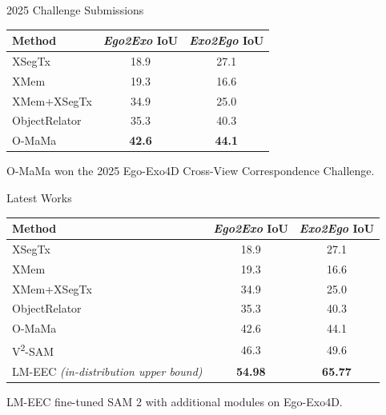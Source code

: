 \documentclass[professionalfonts,aspectratio=169]{beamer}
\begin{document}
\begin{frame}[t]
\begin{center}
{\large 2025 Challenge Submissions}
\end{center}
\vfill
\begin{center}
\centering
\small
\begin{tabular}{lcc}
  \toprule
  Method & \textit{Ego2Exo} IoU & \textit{Exo2Ego} IoU \\
  \midrule
  \color{black!30} XSegTx      & \color{black!30} 18.9 & \color{black!30} 27.1 \\
  \color{black!30} XMem        & \color{black!30} 19.3 & \color{black!30} 16.6 \\
  \color{black!30} XMem+XSegTx & \color{black!30} 34.9 & \color{black!30} 25.0 \\
  \midrule
  \color{black} ObjectRelator & 35.3 & 40.3 \\
  O-MaMa        & \textbf{42.6} & \textbf{44.1} \\
  \bottomrule
\end{tabular}
\end{center}
\vfill
\begin{center}
O-MaMa won the 2025 Ego-Exo4D Cross-View Correspondence Challenge.
\end{center}
\end{frame}

\begin{frame}[t]
\begin{center}
{\large Latest Works}
\end{center}
\vfill
\begin{center}
\centering
\small
\begin{tabular}{lcc}
  \toprule
  Method & \textit{Ego2Exo} IoU & \textit{Exo2Ego} IoU \\
  \midrule
  \color{black!30} XSegTx      & \color{black!30} 18.9 & \color{black!30} 27.1 \\
  \color{black!30} XMem        & \color{black!30} 19.3 & \color{black!30} 16.6 \\
  \color{black!30} XMem+XSegTx & \color{black!30} 34.9 & \color{black!30} 25.0 \\
  \midrule
  \color{black!30} ObjectRelator & \color{black!30} 35.3 & \color{black!30} 40.3 \\
  \color{black!30} O-MaMa        & \color{black!30} 42.6 & \color{black!30} 44.1 \\
  \midrule
  \color{black} V\textsuperscript{2}-SAM & 46.3 & 49.6 \\
  \rowcolor{black!10} LM-EEC \textit{(in-distribution upper bound)} & \textbf{54.98} & \textbf{65.77} \\
  \bottomrule
\end{tabular}
\end{center}
\vfill
\begin{center}
LM-EEC fine-tuned SAM 2 with additional modules on Ego-Exo4D.
\end{center}
\end{frame}
\end{document}
